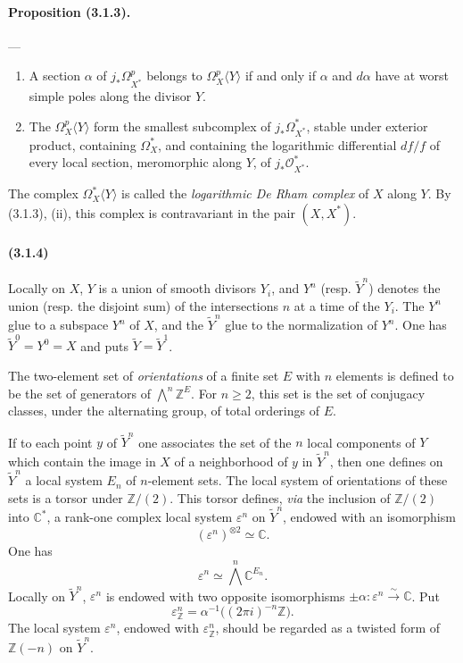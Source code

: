 \documentclass[10pt]{article}
\newcommand{\C}{\mathbb C}
\newcommand{\Z}{\mathbb Z}
\newcommand{\iso}{\xrightarrow{\sim}}
\providecommand{\cO}{\mathcal O}
\providecommand{\cO}{\mathcal O}
\begin{document}
\paragraph{Proposition (3.1.3).} --- {\itshape
\begin{enumerate}[label=(\roman*)]
\item A section $\alpha$ of $j_*\Omega_{X^*}^p$ belongs to $\Omega_X^p\langle Y\rangle$ if and only if $\alpha$ and $d\alpha$ have at worst simple poles along the divisor $Y$.
\item The $\Omega_X^p\langle Y\rangle$ form the smallest subcomplex of $j_*\Omega_{X^*}^*$, stable under exterior product, containing $\Omega_X^*$, and containing the logarithmic differential $df/f$ of every local section, meromorphic along $Y$, of $j_*\cO_{X^*}^*$.
\end{enumerate}}
The complex $\Omega_X^*\langle Y\rangle$ is called the \emph{logarithmic De Rham complex} of $X$ along $Y$. By (3.1.3), (ii), this complex is contravariant in the pair $(X,X^*)$.

\paragraph{(3.1.4)} Locally on $X$, $Y$ is a union of smooth divisors $Y_i$, and $Y^n$ (resp. $\widetilde Y^n$) denotes the union (resp. the disjoint sum) of the intersections $n$ at a time of the $Y_i$. The $Y^n$ glue to a subspace $Y^n$ of $X$, and the $\widetilde Y^n$ glue to the normalization of $Y^n$. One has $\widetilde Y^0=Y^0=X$ and puts $\widetilde Y=\widetilde Y^1$.

The two-element set of \emph{orientations} of a finite set $E$ with $n$ elements is defined to be the set of generators of $\bigwedge^n\Z^E$. For $n\ge2$, this set is the set of conjugacy classes, under the alternating group, of total orderings of $E$.

If to each point $y$ of $\widetilde Y^n$ one associates the set of the $n$ local components of $Y$ which contain the image in $X$ of a neighborhood of $y$ in $\widetilde Y^n$, then one defines on $\widetilde Y^n$ a local system $E_n$ of $n$-element sets. The local system of orientations of these sets is a torsor under $\Z/(2)$. This torsor defines, \emph{via} the inclusion of $\Z/(2)$ into $\C^*$, a rank-one complex local system $\varepsilon^n$ on $\widetilde Y^n$, endowed with an isomorphism
\[
(\varepsilon^n)^{\otimes2}\simeq\C.
\]
One has
\[
\varepsilon^n\simeq\bigwedge^n\C^{E_n}.
\]
Locally on $\widetilde Y^n$, $\varepsilon^n$ is endowed with two opposite isomorphisms $\pm\alpha:\varepsilon^n\iso\C$. Put
\[
\varepsilon_\Z^n=\alpha^{-1}\bigl((2\pi i)^{-n}\Z\bigr).
\]
The local system $\varepsilon^n$, endowed with $\varepsilon_\Z^n$, should be regarded as a twisted form of $\Z(-n)$ on $\widetilde Y^n$.
\end{document}
